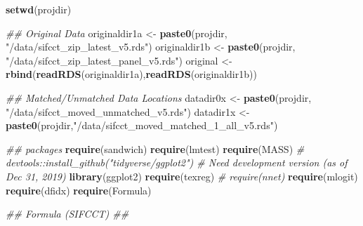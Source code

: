 \documentclass[
]{article}
\newenvironment{Shaded}{\begin{snugshade}}{\end{snugshade}}
\newcommand{\CommentTok}[1]{\textcolor[rgb]{0.56,0.35,0.01}{\textit{#1}}}
\newcommand{\KeywordTok}[1]{\textcolor[rgb]{0.13,0.29,0.53}{\textbf{#1}}}
\newcommand{\NormalTok}[1]{#1}
\newcommand{\StringTok}[1]{\textcolor[rgb]{0.31,0.60,0.02}{#1}}
\begin{document}
\begin{Shaded}
\begin{Highlighting}[]
\KeywordTok{setwd}\NormalTok{(projdir)}

\CommentTok{## Original Data}
\NormalTok{originaldir1a <-}\StringTok{ }\KeywordTok{paste0}\NormalTok{(projdir, }\StringTok{"/data/sifcct_zip_latest_v5.rds"}\NormalTok{)}
\NormalTok{originaldir1b <-}\StringTok{ }\KeywordTok{paste0}\NormalTok{(projdir, }\StringTok{"/data/sifcct_zip_latest_panel_v5.rds"}\NormalTok{)}
\NormalTok{original <-}\StringTok{ }\KeywordTok{rbind}\NormalTok{(}\KeywordTok{readRDS}\NormalTok{(originaldir1a),}\KeywordTok{readRDS}\NormalTok{(originaldir1b))}

\CommentTok{## Matched/Unmatched Data Locations}
\NormalTok{datadir0x <-}\StringTok{ }\KeywordTok{paste0}\NormalTok{(projdir, }\StringTok{"/data/sifcct_moved_unmatched_v5.rds"}\NormalTok{)}
\NormalTok{datadir1x <-}\StringTok{ }\KeywordTok{paste0}\NormalTok{(projdir,}\StringTok{"/data/sifcct_moved_matched_1_all_v5.rds"}\NormalTok{)}

\CommentTok{## packages}
\KeywordTok{require}\NormalTok{(sandwich)}
\KeywordTok{require}\NormalTok{(lmtest)}
\KeywordTok{require}\NormalTok{(MASS)}
\CommentTok{# devtools::install_github("tidyverse/ggplot2") # Need development version (as of Dec 31, 2019)}
\KeywordTok{library}\NormalTok{(ggplot2)}
\KeywordTok{require}\NormalTok{(texreg)}
\CommentTok{# require(nnet)}
\KeywordTok{require}\NormalTok{(mlogit)}
\KeywordTok{require}\NormalTok{(dfidx)}
\KeywordTok{require}\NormalTok{(Formula)}


\CommentTok{## Formula (SIFCCT) ##}


\end{Highlighting}
\end{Shaded}
\end{document}
